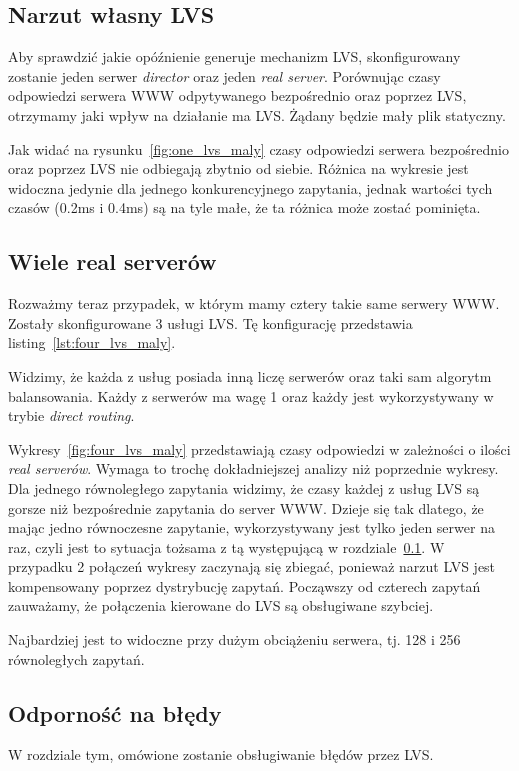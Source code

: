 \subsection{Narzut własny LVS}
\label{sec:lvs_narzut}
Aby sprawdzić jakie opóźnienie generuje mechanizm LVS, skonfigurowany zostanie jeden serwer \textit{director} oraz jeden \textit{real server}.
Porównując czasy odpowiedzi serwera WWW odpytywanego bezpośrednio oraz poprzez LVS, otrzymamy jaki wpływ na działanie ma LVS\@.
Żądany będzie mały plik statyczny.

Jak widać na rysunku~\ref{fig:one_lvs_maly} czasy odpowiedzi serwera bezpośrednio oraz poprzez LVS nie odbiegają zbytnio od siebie.
Różnica na wykresie jest widoczna jedynie dla jednego konkurencyjnego zapytania, jednak wartości tych czasów (0.2ms i 0.4ms) są na tyle małe, że ta różnica może zostać pominięta.
\subsection{Wiele real serverów}
Rozważmy teraz przypadek, w którym mamy cztery takie same serwery WWW\@.
Zostały skonfigurowane 3 usługi LVS\@. Tę konfigurację przedstawia listing~\ref{lst:four_lvs_maly}.
\footnotesize

\normalsize
Widzimy, że każda z usług posiada inną liczę serwerów oraz taki sam algorytm balansowania.
Każdy z serwerów ma wagę 1 oraz każdy jest wykorzystywany w trybie \textit{direct routing}.

Wykresy~\ref{fig:four_lvs_maly} przedstawiają czasy odpowiedzi w zależności o ilości \textit{real serverów}.
Wymaga to trochę dokładniejszej analizy niż poprzednie wykresy.
Dla jednego równoległego zapytania widzimy, że czasy każdej z usług LVS są gorsze niż bezpośrednie zapytania do server WWW\@.
Dzieje się tak dlatego, że mając jedno równoczesne zapytanie, wykorzystywany jest tylko jeden serwer na raz, czyli jest to sytuacja tożsama z tą występującą w rozdziale~\ref{sec:lvs_narzut}.
W przypadku 2 połączeń wykresy zaczynają się zbiegać, ponieważ narzut LVS jest kompensowany poprzez dystrybucję zapytań.
Począwszy od czterech zapytań zauważamy, że połączenia kierowane do LVS są obsługiwane szybciej.

Najbardziej jest to widoczne przy dużym obciążeniu serwera, tj. 128 i 256 równoległych zapytań.
\subsection{Odporność na błędy}
W rozdziale tym, omówione zostanie obsługiwanie błędów przez LVS.
